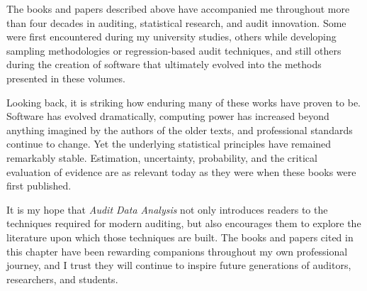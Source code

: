 The books and papers described above have accompanied me throughout more than four decades in auditing, statistical research, and audit innovation. Some were first encountered during my university studies, others while developing sampling methodologies or regression-based audit techniques, and still others during the creation of software that ultimately evolved into the methods presented in these volumes.

Looking back, it is striking how enduring many of these works have proven to be. Software has evolved dramatically, computing power has increased beyond anything imagined by the authors of the older texts, and professional standards continue to change. Yet the underlying statistical principles have remained remarkably stable. Estimation, uncertainty, probability, and the critical evaluation of evidence are as relevant today as they were when these books were first published.

It is my hope that \textit{Audit Data Analysis} not only introduces readers to the techniques required for modern auditing, but also encourages them to explore the literature upon which those techniques are built. The books and papers cited in this chapter have been rewarding companions throughout my own professional journey, and I trust they will continue to inspire future generations of auditors, researchers, and students.
